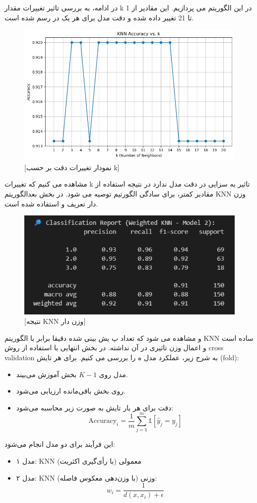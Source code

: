 \documentclass{article}
\begin{document}
\clearpage
در ادامه، به بررسی تاثیر تغییرات مقدار k در این الگوریتم می پردازیم. این مقادیر از 1 تا 21 تغییر داده شده و دقت مدل برای هر یک در رسم شده است.
\begin{figure}[h!]
	\centering
	\includegraphics[width=0.7\linewidth]{14}
	\caption{[نمودار تغییرات دقت بر حسب k]}
	\label{fig:14}
\end{figure}
\clearpage
مشاهده می کنیم که تغییرات k تاثیر به سزایی در دقت مدل ندارد در نتیجه استفاده از مقادیر کمتر، برای سادگی الگورتیم توصیه می شود.
در بخش بعدالگوریتم KNN وزن دار تعریف و استفاده شده است.
\begin{figure}[h!]
	\centering
	\includegraphics[width=0.7\linewidth]{15}
	\caption{[نتیجه KNN وزن دار]}
	\label{fig:15}
\end{figure}
\clearpage
و مشاهده می شود که تعداد پ
یش بینی شده دقیقا برابر با الگوریتم KNN ساده است و اعمال وزن تاثیری در آن نداشته.
در بخش انتهایی با استفاده از روش cross validation به شرح زیر، عملکرد مدل ه را بررسی می کنیم.
برای هر تایش (fold):
\begin{itemize}
	\item مدل روی $K - 1$ بخش آموزش می‌بیند.
	\item روی بخش باقی‌مانده ارزیابی می‌شود.
	\item دقت برای هر بار تایش به صورت زیر محاسبه می‌شود:
	\[
	\text{Accuracy}_i = \frac{1}{m} \sum_{j=1}^{m} \mathbb{1}[\hat{y}_j = y_j]
	\]
\end{itemize}

این فرآیند برای دو مدل انجام می‌شود:
\begin{itemize}
	\item مدل ۱: KNN معمولی (با رأی‌گیری اکثریت)
	\item مدل ۲: KNN وزنی (با وزن‌دهی معکوس فاصله):
	\[
	w_i = \frac{1}{d(x, x_i) + \epsilon}
	\]
\end{itemize}
\end{document}
